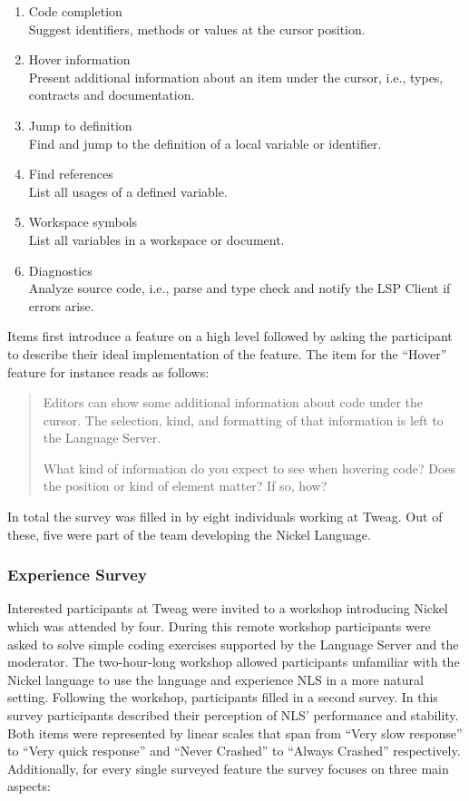 \documentclass[
  a4paper,
  bibtex,
  english,
  nomenclature]{kthlatex/kththesis/kththesis}
\providecommand{\tightlist}{%
  \setlength{\itemsep}{0pt}\setlength{\parskip}{0pt}}
\begin{document}
\begin{enumerate}
\def\labelenumi{\arabic{enumi}.}
\tightlist
\item
  Code completion\\
  Suggest identifiers, methods or values at the cursor position.
\item
  Hover information\\
  Present additional information about an item under the cursor, i.e.,
  types, contracts and documentation.
\item
  Jump to definition\\
  Find and jump to the definition of a local variable or identifier.
\item
  Find references\\
  List all usages of a defined variable.
\item
  Workspace symbols\\
  List all variables in a workspace or document.
\item
  Diagnostics\\
  Analyze source code, i.e., parse and type check and notify the LSP
  Client if errors arise.
\end{enumerate}

Items first introduce a feature on a high level followed by asking the
participant to describe their ideal implementation of the feature. The
item for the ``Hover'' feature for instance reads as follows:

\begin{quote}
Editors can show some additional information about code under the
cursor. The selection, kind, and formatting of that information is left
to the Language Server.

What kind of information do you expect to see when hovering code? Does
the position or kind of element matter? If so, how?
\end{quote}

In total the survey was filled in by eight individuals working at Tweag.
Out of these, five were part of the team developing the Nickel Language.

\hypertarget{sec:experience-survey}{%
\subsubsection{Experience Survey}\label{sec:experience-survey}}

Interested participants at Tweag were invited to a workshop introducing
Nickel which was attended by four. During this remote workshop
participants were asked to solve simple coding exercises supported by
the Language Server and the moderator. The two-hour-long workshop
allowed participants unfamiliar with the Nickel language to use the
language and experience NLS in a more natural setting. Following the
workshop, participants filled in a second survey. In this survey
participants described their perception of NLS' performance and
stability. Both items were represented by linear scales that span from
``Very slow response'' to ``Very quick response'' and ``Never Crashed''
to ``Always Crashed'' respectively. Additionally, for every single
surveyed feature the survey focuses on three main aspects:
\end{document}
